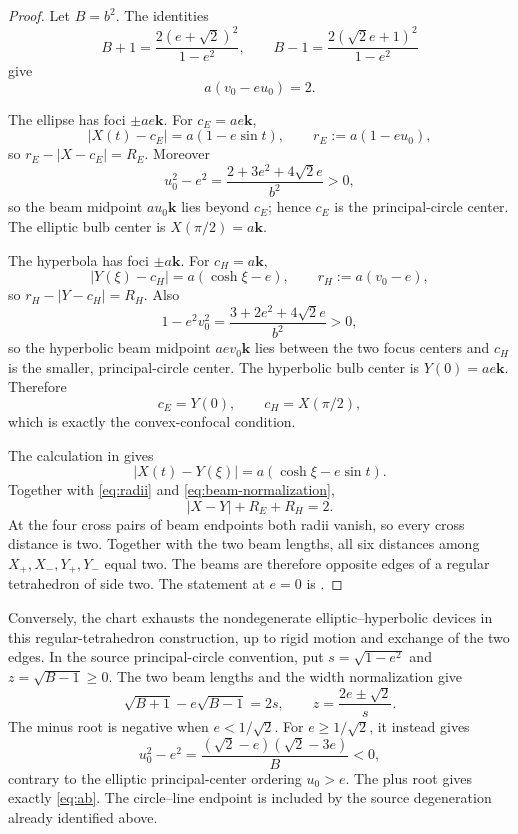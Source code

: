 \documentclass[11pt]{article}
\numberwithin{equation}{section}
\theoremstyle{remark}
\begin{document}
\begin{proof}
Let \(B=b^2\).  The identities
\[
  B+1=\frac{2(e+\sqrt2)^2}{1-e^2},
  \qquad
  B-1=\frac{2(\sqrt2e+1)^2}{1-e^2}
\]
give
\begin{equation}
  a(v_0-eu_0)=2.
  \label{eq:beam-normalization}
\end{equation}

The ellipse has foci \(\pm ae\mathbf k\).  For \(c_E=ae\mathbf k\),
\[
  |X(t)-c_E|=a(1-e\sin t),
  \qquad
  r_E:=a(1-eu_0),
\]
so \(r_E-|X-c_E|=R_E\).  Moreover
\[
  u_0^2-e^2=\frac{2+3e^2+4\sqrt2e}{b^2}>0,
\]
so the beam midpoint \(a u_0\mathbf k\) lies beyond \(c_E\); hence \(c_E\) is the principal-circle center.  The elliptic bulb center is \(X(\pi/2)=a\mathbf k\).

The hyperbola has foci \(\pm a\mathbf k\).  For \(c_H=a\mathbf k\),
\[
  |Y(\xi)-c_H|=a(\cosh\xi-e),
  \qquad
  r_H:=a(v_0-e),
\]
so \(r_H-|Y-c_H|=R_H\).  Also
\[
  1-e^2v_0^2=\frac{3+2e^2+4\sqrt2e}{b^2}>0,
\]
so the hyperbolic beam midpoint \(ae v_0\mathbf k\) lies between the two focus centers and \(c_H\) is the smaller, principal-circle center.  The hyperbolic bulb center is \(Y(0)=ae\mathbf k\).  Therefore
\[
  c_E=Y(0),
  \qquad
  c_H=X(\pi/2),
\]
which is exactly the convex-confocal condition.

The calculation in  gives
\begin{equation}
  |X(t)-Y(\xi)|=a(\cosh\xi-e\sin t).
  \label{eq:center-distance}
\end{equation}
Together with \eqref{eq:radii} and \eqref{eq:beam-normalization},
\begin{equation}
  |X-Y|+R_E+R_H=2.
  \label{eq:local-width}
\end{equation}
At the four cross pairs of beam endpoints both radii vanish, so every cross distance is two.  Together with the two beam lengths, all six distances among \(X_+,X_-,Y_+,Y_-\) equal two.  The beams are therefore opposite edges of a regular tetrahedron of side two.  The statement at \(e=0\) is \cite[Section~5.3]{ArelioMontejanoOliveros2023}.
\end{proof}

Conversely, the chart exhausts the nondegenerate elliptic--hyperbolic
devices in this regular-tetrahedron construction, up to rigid motion and
exchange of the two edges.  In the source principal-circle convention,
put \(s=\sqrt{1-e^2}\) and \(z=\sqrt{B-1}\ge0\).  The two beam lengths
and the width normalization give
\[
  \sqrt{B+1}-e\sqrt{B-1}=2s,
  \qquad z=\frac{2e\pm\sqrt2}{s}.
\]
The minus root is negative when \(e<1/\sqrt2\).  For
\(e\ge1/\sqrt2\), it instead gives
\[
  u_0^2-e^2=\frac{(\sqrt2-e)(\sqrt2-3e)}{B}<0,
\]
contrary to the elliptic principal-center ordering \(u_0>e\).
The plus root gives exactly \eqref{eq:ab}.  The circle--line endpoint
is included by the source degeneration already identified above.
\end{document}
